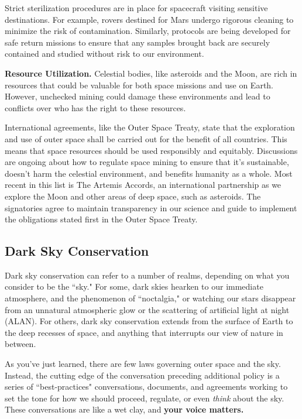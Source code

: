 Strict sterilization procedures are in place for spacecraft visiting sensitive destinations. For example, rovers destined for Mars undergo rigorous cleaning to minimize the risk of contamination. Similarly, protocols are being developed for safe return missions to ensure that any samples brought back are securely contained and studied without risk to our environment.

\textbf{Resource Utilization.} Celestial bodies, like asteroids and the Moon, are rich in resources that could be valuable for both space missions and use on Earth. However, unchecked mining could damage these environments and lead to conflicts over who has the right to these resources.

International agreements, like the Outer Space Treaty, state that the exploration and use of outer space shall be carried out for the benefit of all countries. This means that space resources should be used responsibly and equitably. Discussions are ongoing about how to regulate space mining to ensure that it's sustainable, doesn't harm the celestial environment, and benefits humanity as a whole. Most recent in this list is The Artemis Accords, an international partnership as we explore the Moon and other areas of deep space, such as asteroids. The signatories agree to maintain transparency in our science and guide to implement the obligations stated first in the Outer Space Treaty.

\subsection{Dark Sky Conservation}

Dark sky conservation can refer to a number of realms, depending on what you consider to be the ``sky." For some, dark skies hearken to our immediate atmosphere, and the phenomenon of ``noctalgia," or watching our stars disappear from an unnatural atmospheric glow or the scattering of artificial light at night (ALAN). For others, dark sky conservation extends from the surface of Earth to the deep recesses of space, and anything that interrupts our view of nature in between. 

As you've just learned, there are few laws governing outer space and the sky. Instead, the cutting edge of the conversation preceding additional policy is a series of ``best-practices" conversations, documents, and agreements working to set the tone for how we should proceed, regulate, or even \textit{think} about the sky. These conversations are like a wet clay, and \textbf{your voice matters.} 

